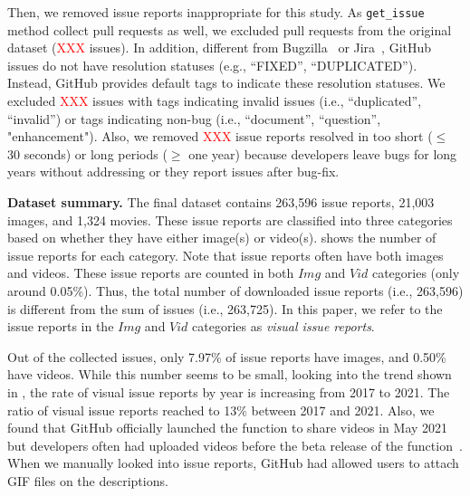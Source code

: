 Then, we removed issue reports inappropriate for this study. As \texttt{get\_issue} method collect pull requests as well, we excluded pull requests from the original dataset (\textcolor{red}{XXX} issues).  
In addition, different from Bugzilla~\citep{Bugzilla} or Jira~\citep{JIRA}, GitHub issues do not have resolution statuses (e.g., ``FIXED'', ``DUPLICATED''). 
Instead,  GitHub provides default tags to indicate these resolution statuses. 
We excluded \textcolor{red}{XXX} issues with tags indicating invalid issues (i.e., ``duplicated'', ``invalid'') or tags indicating non-bug (i.e., ``document'', ``question'', "enhancement"). Also, we removed \textcolor{red}{XXX} issue reports resolved in too short ($\leq$ 30 seconds) or long periods  ($\geq$ one year) because developers leave bugs for long years without addressing or they report issues after bug-fix. 


{\bf Dataset summary.} The final dataset contains 263,596 issue reports,  21,003 images, and 1,324 movies. 
These issue reports are classified into three categories based on whether they have either image(s) or video(s). 
 shows the number of issue reports for each category. 
Note that issue reports often have both images and videos. 
These issue reports are counted in both $Img$ and $Vid$ categories (only around 0.05\%). 
Thus, the total number of downloaded issue reports (i.e., 263,596) is different from the sum of issues (i.e., 263,725).
In this paper, we refer to the issue reports in the $Img$ and $Vid$ categories
as \textit{visual issue reports}. 


Out of the collected issues, only 7.97\% of issue reports have images, and 0.50\% have videos. 
While this number seems to be small, looking into the trend shown in , the rate of visual issue reports by year is increasing from 2017 to 2021. 
The ratio of visual issue reports reached to 13\% between 2017 and 2021. 
Also, we found that GitHub officially launched the function to share videos in May 2021 but developers often had uploaded videos before the beta release of the function~\citep{github-video-blog}. 
When we manually looked into issue reports, GitHub had allowed users to attach GIF files on the descriptions.

% 
%

